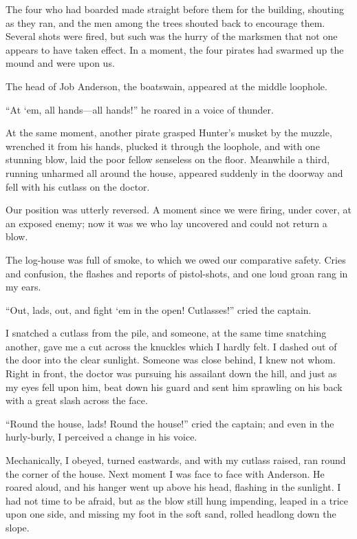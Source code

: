 The four who had boarded made straight before them for the building, shouting as they ran, and the men among the trees shouted back to encourage them. Several shots were fired, but such was the hurry of the marksmen that not one appears to have taken effect. In a moment, the four pirates had swarmed up the mound and were upon us.

The head of Job Anderson, the boatswain, appeared at the middle loophole.

\enquote{At `em, all hands---all hands!} he roared in a voice of thunder.

At the same moment, another pirate grasped Hunter’s musket by the muzzle, wrenched it from his hands, plucked it through the loophole, and with one stunning blow, laid the poor fellow senseless on the floor. Meanwhile a third, running unharmed all around the house, appeared suddenly in the doorway and fell with his cutlass on the doctor.

Our position was utterly reversed. A moment since we were firing, under cover, at an exposed enemy; now it was we who lay uncovered and could not return a blow.

The log-house was full of smoke, to which we owed our comparative safety. Cries and confusion, the flashes and reports of pistol-shots, and one loud groan rang in my ears.

\enquote{Out, lads, out, and fight `em in the open! Cutlasses!} cried the captain.

I snatched a cutlass from the pile, and someone, at the same time snatching another, gave me a cut across the knuckles which I hardly felt. I dashed out of the door into the clear sunlight. Someone was close behind, I knew not whom. Right in front, the doctor was pursuing his assailant down the hill, and just as my eyes fell upon him, beat down his guard and sent him sprawling on his back with a great slash across the face.

\enquote{Round the house, lads! Round the house!} cried the captain; and even in the hurly-burly, I perceived a change in his voice.

Mechanically, I obeyed, turned eastwards, and with my cutlass raised, ran round the corner of the house. Next moment I was face to face with Anderson. He roared aloud, and his hanger went up above his head, flashing in the sunlight. I had not time to be afraid, but as the blow still hung impending, leaped in a trice upon one side, and missing my foot in the soft sand, rolled headlong down the slope.

